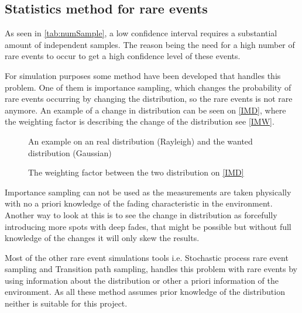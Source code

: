 \newpage
\subsection{Statistics method for rare events}\label{sampleEQ}
As seen in \autoref{tab:numSample}, a low confidence interval requires a substantial amount of independent samples. The reason being the need for a high number of rare events to occur to get a high confidence level of these events. 

For simulation purposes some method have been developed that handles this problem. One of them is importance sampling, which changes the probability of rare events occurring by changing the distribution, so the rare events is not rare anymore. An example of a change in distribution can be seen on \autoref{IMD}, where the weighting factor is describing the change of the distribution see \autoref{IMW}. 

\begin{minipage}[t]{0.48\textwidth}
\centering
\begin{figure}[H]

\caption{An example on an real distribution (Rayleigh) and the wanted distribution (Gaussian)}
\label{IMD}
\end{figure}
\end{minipage}%
\hspace{0.03\textwidth}
\begin{minipage}[t]{0.48\textwidth}
\centering
\begin{figure}[H]

\caption{The weighting factor between the two distribution on \autoref{IMD}}
\label{IMW}
\end{figure}
\end{minipage}
\vspace{1em}

Importance sampling can not be used as the measurements are taken physically with no a priori knowledge of the fading characteristic in the environment. Another way to look at this is to see the change in distribution as forcefully introducing more spots with deep fades, that might be possible but without full knowledge of the changes it will only skew the results.

Most of the other rare event simulations tools i.e. Stochastic process rare event sampling and Transition path sampling, handles this problem with rare events by using information about the distribution or other a priori information of the environment. As all these method assumes prior knowledge of the distribution neither is suitable for this project.


